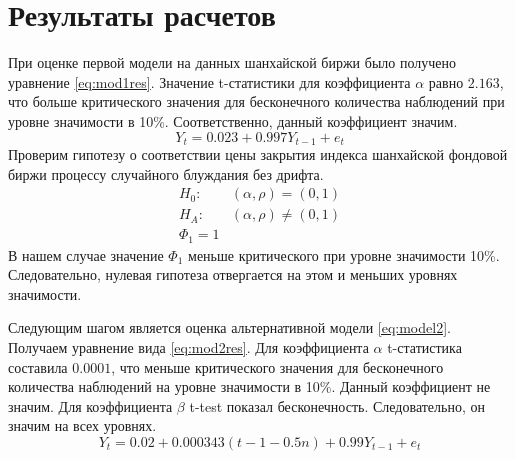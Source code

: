 \documentclass[a4paper,12pt]{article}
\begin{document}
\section{Результаты расчетов}
При оценке первой модели на данных шанхайской биржи было получено уравнение \ref{eq:mod1res}. Значение t-статистики для коэффициента $\alpha$ равно $2.163$, что больше критического значения для бесконечного количества наблюдений при уровне значимости в 10\%. Соответственно, данный коэффициент значим.
  \begin{equation}
    \label{eq:mod1res}
    Y_t=0.023+0.997Y_{t-1}+e_t
  \end{equation}
Проверим гипотезу о соответствии цены закрытия индекса шанхайской фондовой биржи процессу случайного блуждания без дрифта.
\begin{align}
  H_0:&(\alpha,\rho)=(0,1)\\
  H_A:&(\alpha,\rho)\neq(0,1)\\
  \Phi_1=1
\end{align}
В нашем случае значение $\Phi_1$ меньше критического при уровне значимости 10\%. Следовательно, нулевая гипотеза отвергается на этом и меньших уровнях значимости.

Следующим шагом является оценка альтернативной модели \ref{eq:model2}. Получаем уравнение вида \ref{eq:mod2res}. Для коэффициента $\alpha$ t-статистика составила $0.0001$, что меньше критического значения для бесконечного количества наблюдений на уровне значимости в 10\%. Данный коэффициент не значим. Для коэффициента $\beta$ t-test показал бесконечность. Следовательно, он значим на всех уровнях.
\begin{equation}
  \label{eq:mod2res}
  Y_t=0.02+0.000343(t-1-0.5n)+0.99Y_{t-1}+e_t
\end{equation}

\newpage


\end{document}
